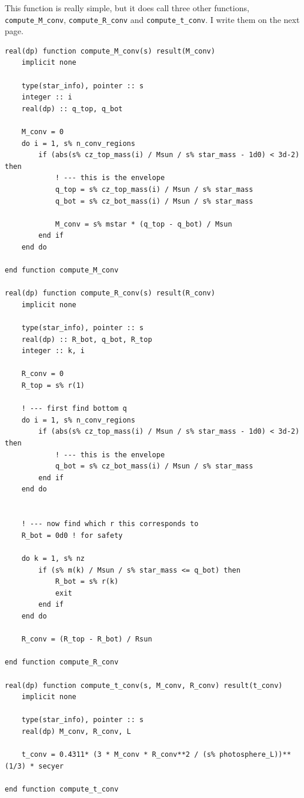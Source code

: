 \documentclass[a4paper,10pt]{article}
\begin{document}
This function is really simple, but it does call three other functions, \lstinline[style=output, breaklines=true]|compute_M_conv|, \lstinline[style=output, breaklines=true]|compute_R_conv| and \lstinline[style=output, breaklines=true]|compute_t_conv|. I write them on the next page.
\nextpage
\begin{verbatim}
real(dp) function compute_M_conv(s) result(M_conv)
    implicit none

    type(star_info), pointer :: s
    integer :: i
    real(dp) :: q_top, q_bot

    M_conv = 0
    do i = 1, s% n_conv_regions
        if (abs(s% cz_top_mass(i) / Msun / s% star_mass - 1d0) < 3d-2) then
            ! --- this is the envelope
            q_top = s% cz_top_mass(i) / Msun / s% star_mass
            q_bot = s% cz_bot_mass(i) / Msun / s% star_mass
    
            M_conv = s% mstar * (q_top - q_bot) / Msun
        end if
    end do

end function compute_M_conv

real(dp) function compute_R_conv(s) result(R_conv)
    implicit none

    type(star_info), pointer :: s
    real(dp) :: R_bot, q_bot, R_top
    integer :: k, i

    R_conv = 0
    R_top = s% r(1)

    ! --- first find bottom q
    do i = 1, s% n_conv_regions
        if (abs(s% cz_top_mass(i) / Msun / s% star_mass - 1d0) < 3d-2) then
            ! --- this is the envelope
            q_bot = s% cz_bot_mass(i) / Msun / s% star_mass
        end if
    end do


    ! --- now find which r this corresponds to
    R_bot = 0d0 ! for safety

    do k = 1, s% nz
        if (s% m(k) / Msun / s% star_mass <= q_bot) then
            R_bot = s% r(k)
            exit
        end if
    end do

    R_conv = (R_top - R_bot) / Rsun

end function compute_R_conv

real(dp) function compute_t_conv(s, M_conv, R_conv) result(t_conv)
    implicit none

    type(star_info), pointer :: s
    real(dp) M_conv, R_conv, L

    t_conv = 0.4311* (3 * M_conv * R_conv**2 / (s% photosphere_L))**(1/3) * secyer

end function compute_t_conv
\end{verbatim}
\end{document}
